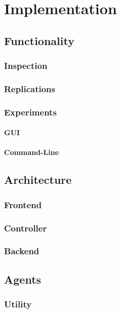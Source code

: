 \documentclass[Bachelorarbeit.tex]{subfiles}
\begin{document}
\chapter{Implementation}

\section{Functionality}

\subsection{Inspection}

\subsection{Replications}

\subsection{Experiments}
\subsubsection{GUI}
\subsubsection{Command-Line}

\section{Architecture}
\subsection{Frontend}
\subsection{Controller}
\subsection{Backend}

\section{Agents}
\subsection{Utility}
\end{document}
